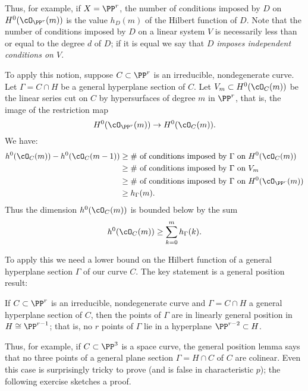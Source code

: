 Thus, for example, if $X = \PP^r$, the number of conditions imposed by $D$ on $H^0(\cO_{\PP^r}(m))$ is the value $h_D(m)$ of the Hilbert function of $D$.
Note that the number of conditions imposed by $D$ on a linear system $V$ is necessarily less than or equal to the degree $d$ of $D$; if it is equal we say that $D$ \emph{imposes independent conditions on $V$}.

To apply this notion, suppose $C \subset \PP^r$ is an irreducible, nondegenerate curve. Let $\Gamma = C \cap H$ be a general hyperplane section of $C$. Let $V_m \subset H^0(\cO_C(m))$ be the linear series cut on $C$ by hypersurfaces of degree $m$ in $\PP^r$, that is, the image of the restriction map
$$
H^0(\cO_{\PP^r}(m)) \to H^0(\cO_C(m)).
$$
We have:
\begin{align*}
h^0(\cO_C(m)) - h^0(\cO_C(m-1)) & \geq \text{\# of conditions imposed by $\Gamma$ on $H^0(\cO_C(m))$} \\
&\geq \text{\# of conditions imposed by $\Gamma$ on $V_m$} \\
&\geq \text{\# of conditions imposed by $\Gamma$ on $H^0(\cO_{\PP^r}(m))$} \\
&\geq h_\Gamma(m).
\end{align*}
Thus the dimension $h^0(\cO_C(m))$ is bounded below by the sum
$$
h^0(\cO_C(m)) \geq \sum_{k=0}^m h_\Gamma(k).
$$

To apply this we need a lower bound on the Hilbert function of a general hyperplane section $\Gamma$ of our curve $C$. The key statement is a general position result:

\begin{lemma}\label{general position lemma}
If $C \subset \PP^r$ is an irreducible, nondegenerate curve and $\Gamma = C \cap H$ a general hyperplane section of $C$, then the points of $\Gamma$ are in linearly general position in $H \cong \PP^{r-1}$; that is, no $r$ points of $\Gamma$ lie in a hyperplane $\PP^{r-2} \subset H$.
\end{lemma}

Thus, for example, if $C \subset \PP^3$ is a space curve, the general position lemma says that no three points of a general plane section $\Gamma = H \cap C$ of $C$ are colinear. Even this case is surprisingly tricky to prove (and is false in characteristic $p$); the following exercise sketches a proof.


